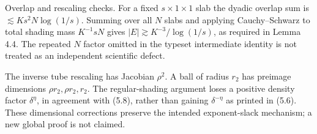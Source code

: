 \documentclass[10pt]{article}
\begin{document}
Overlap and rescaling checks. For a fixed \(s\times1\times1\) slab the dyadic overlap sum is \(\lesssim Ks^2N\log(1/s)\). Summing over all \(N\) slabs and applying Cauchy–Schwarz to total shading mass \(K^{-1}sN\) gives \(|E|\gtrsim K^{-3}/\log(1/s)\), as required in Lemma 4.4. The repeated \(N\) factor omitted in the typeset intermediate identity is not treated as an independent scientific defect.\par
The inverse tube rescaling has Jacobian \(\rho^2\). A ball of radius \(r_2\) has preimage dimensions \(\rho r_2,\rho r_2,r_2\). The regular-shading argument loses a positive density factor \(\delta^\eta\), in agreement with (5.8), rather than gaining \(\delta^{-\eta}\) as printed in (5.6). These dimensional corrections preserve the intended exponent-slack mechanism; a new global proof is not claimed.\par
\end{document}

